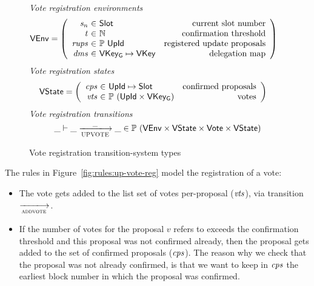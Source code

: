 \begin{figure}[htb]
  \emph{Vote registration environments}
  \begin{align*}
    & \VEnv
      = \left(
      \begin{array}{r@{~\in~}lr}
        \var{s_n} & \Slot & \text{current slot number}\\
        \var{t} & \mathbb{N} & \text{confirmation threshold}\\
        \var{rups} & \powerset{\UPropId}
        & \text{registered update proposals}\\
        \var{dms} & \VKeyGen \mapsto \VKey & \text{delegation map}
      \end{array}\right)
  \end{align*}
  \emph{Vote registration states}
  \begin{align*}
    & \VState
      = \left(
      \begin{array}{r@{~\in~}lr}
        \var{cps} & \UPropId \mapsto \Slot & \text{confirmed proposals}\\
        \var{vts} & \powerset{(\UPropId \times \VKeyGen)} & \text{votes}
      \end{array}\right)
  \end{align*}
  \emph{Vote registration transitions}
    \begin{equation*}
    \_ \vdash \_ \trans{UPVOTE}{\_} \_ \in
    \powerset (\VEnv \times \VState \times \Vote \times \VState)
    \end{equation*}
  \caption{Vote registration transition-system types}
  \label{fig:ts-types:vote-reg}
\end{figure}

The rules in Figure~\ref{fig:rules:up-vote-reg} model the registration of a vote:
\begin{itemize}
\item The vote gets added to the list set of votes per-proposal ($\mathit{vts}$),
  via transition $\trans{addvote}{}$.
\item If the number of votes for the proposal $v$ refers to exceeds the
  confirmation threshold and this proposal was not confirmed already, then the
  proposal gets added to the set of confirmed proposals ($\mathit{cps}$). The
  reason why we check that the proposal was not already confirmed, is that we
  want to keep in $\mathit{cps}$ the earliest block number in which the proposal
  was confirmed.
\end{itemize}

